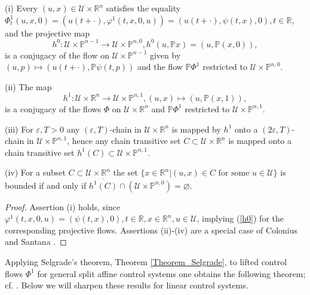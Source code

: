 \documentclass{siamltex}%
\begin{document}
\begin{proposition}
\label{Proposition_e}(i) Every $(u,x)\in\mathcal{U}\times\mathbb{R}^{n}$
satisfies the equality $\Phi_{t}^{1}(u,x,0)=(u(t+\cdot),\varphi^{1}%
(t,x,0,u))=(u(t+\cdot),\psi(t,x),0),\allowbreak t\in\mathbb{R}$, and the
projective map%
\begin{equation}
h^{0}:\mathcal{U}\times\mathbb{P}^{n-1}\rightarrow\mathcal{U}\times
\mathbb{P}^{n,0},h^{0}(u,\mathbb{P}x)=(u,\mathbb{P}(x,0)), \label{h0}%
\end{equation}
is a conjugacy of the flow on $\mathcal{U}\times\mathbb{P}^{n-1}$ given by
$(u,p)\mapsto(u(t+\cdot),\mathbb{P}\psi(t,p))$ and the flow $\mathbb{P}%
\Phi^{1}$ restricted to $\mathcal{U}\times\mathbb{P}^{n,0}$.

(ii) The map%
\begin{equation}
h^{1}:\mathcal{U}\times\mathbb{R}^{n}\rightarrow\mathcal{U}\times
\mathbb{P}^{n,1},(u,x)\mapsto(u,\mathbb{P}(x,1)), \label{h1}%
\end{equation}
is a conjugacy of the flows $\Phi$ on $\mathcal{U}\times\mathbb{R}^{n}$ and
$\mathbb{P}\Phi^{1}$ restricted to $\mathcal{U}\times\mathbb{P}^{n,1}$.

(iii) For $\varepsilon,T>0$ any $(\varepsilon,T)$-chain in $\mathcal{U}%
\times\mathbb{R}^{n}$ is mapped by $h^{1}$ onto a $(2\varepsilon,T)$-chain in
$\mathcal{U}\times\mathbb{P}^{n,1}$, hence any chain transitive set
$C\subset\mathcal{U}\times\mathbb{R}^{n}$ is mapped onto a chain transitive
set $h^{1}(C)\subset\mathcal{U}\times\mathbb{P}^{n,1}$.

(iv) For a subset $C\subset\mathcal{U}\times\mathbb{R}^{n}$ the set
$\{x\in\mathbb{R}^{n}\left\vert (u,x)\in C\text{ for some }u\in\mathcal{U}%
\right.  \}$ is bounded if and only if $\overline{h^{1}(C)}\cap(\mathcal{U}%
\times\mathbb{P}^{n,0})=\varnothing$.
\end{proposition}

\begin{proof}
Assertion (i) holds, since $\varphi^{1}(t,x,0,u)=(\psi(t,x),0),t\in
\mathbb{R},x\in\mathbb{R}^{n},u\in\mathcal{U}$, implying (\ref{h0}) for the
corresponding projective flows. Assertions (ii)-(iv) are a special case of
Colonius and Santana \cite[Proposition 9]{ColS23}.
\end{proof}

Applying Selgrade's theorem, Theorem \ref{Theorem_Selgrade}, to lifted control
flows $\Phi^{1}$ for general split affine control systems one obtains the
following theorem; cf. \cite[Corollary 32, Remark 34]{ColS23}. Below we will
sharpen these results for linear control systems.
\end{document}
